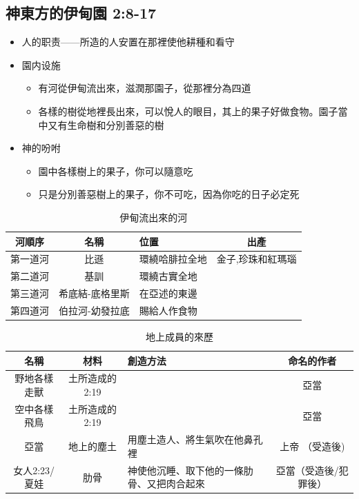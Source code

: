 \subsection{神東方的伊甸園 2:8-17 }
\begin{itemize} 
\itemsep-.35em 
\item 人的职责——所造的人安置在那裡使他耕種和看守
\item 園内设施
\begin{itemize} 
\itemsep-.35em 
\item 有河從伊甸流出來，滋潤那園子，從那裡分為四道
\item 各樣的樹從地裡長出來，可以悅人的眼目，其上的果子好做食物。園子當中又有生命樹和分別善惡的樹
\end{itemize}
\item 神的吩咐
\begin{itemize} 
\itemsep-.35em 
\item 園中各樣樹上的果子，你可以隨意吃 
\item 只是分別善惡樹上的果子，你不可吃，因為你吃的日子必定死 
\end{itemize}
\end{itemize}

\begin{table}[H]
\centering
\begin{tabular}{|c|c|l|c|}
\hline
河順序   & 名稱 & 位置          & 出產                \\\hline
第一道河 & 比遜 & 環繞哈腓拉全地& 金子,珍珠和紅瑪瑙   \\\hline
第二道河 &基訓  & 環繞古實全地  &                     \\\hline
第三道河 &希底結-底格里斯&在亞述的東邊 &　						\\\hline
第四道河 &伯拉河-幼發拉底&賜給人作食物 &　						\\\hline
\end{tabular}
\caption{伊甸流出來的河}
\end{table}


\begin{table}[!hbp]
\centering
\begin{tabular}{|c|c|l|c| }
\hline
名稱  & 材料 & 創造方法   & 命名的作者           \\\hline
野地各樣走獸 &土所造成的 2:19&  &亞當   \\\hline
空中各樣飛鳥 &土所造成的  2:19&    &亞當       \\\hline
亞當 &地上的塵土&用塵土造人、將生氣吹在他鼻孔裡　&上帝	（受造後)					\\\hline
女人2:23/夏娃 &肋骨&神使他沉睡、取下他的一條肋骨、又把肉合起來 &亞當（受造後/犯罪後）						\\\hline
\end{tabular}
\caption{地上成員的來歷}
\end{table}




